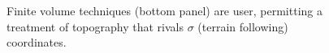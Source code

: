 \begin{figure}
\caption{Finite volume techniques (bottom panel) are user, permitting
a treatment of topography that rivals $\sigma$ (terrain following)
coordinates.}
\label{fig:finite-volumes}
\end{figure}
